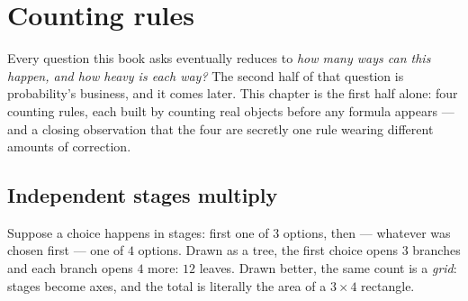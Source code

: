 \chapter{Counting rules}

\begin{narrative}
Every question this book asks eventually reduces to \emph{how many ways can
this happen, and how heavy is each way?} The second half of that question
is probability's business, and it comes later. This chapter is the first
half alone: four counting rules, each built by counting real objects before
any formula appears — and a closing observation that the four are secretly
one rule wearing different amounts of correction.

\section{Independent stages multiply}

Suppose a choice happens in stages: first one of $3$ options, then —
whatever was chosen first — one of $4$ options. Drawn as a tree, the first
choice opens $3$ branches and each branch opens $4$ more: $12$ leaves.
Drawn better, the same count is a \emph{grid}: stages become axes, and the
total is literally the area of a $3 \times 4$ rectangle.

\begin{center}
\end{center}


\end{narrative}
